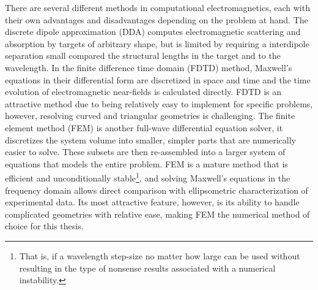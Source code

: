There are several different methods in computational electromagnetics, each with their own advantages and disadvantages depending on the problem at hand. The discrete dipole approximation (DDA) computes electromagnetic scattering and absorption by targets of arbitrary shape, but is limited by requiring a interdipole separation small compared the structural lengths in the target and to the wavelength\cite{DDA}. In the finite difference time domain (FDTD) method, Maxwell's equations in their differential form are discretized in space and time and the time evolution of electromagnetic near-fields is calculated directly\cite{FDTD}. FDTD is an attractive method due to being relatively easy to implement for specific problems, however, resolving curved and triangular geometries is challenging. The finite element method (FEM) is another full-wave differential equation solver, it discretizes the system volume into smaller, simpler parts that are numerically easier to solve. These subsets are then re-assembled into a larger system of equations that models the entire problem\cite{FEM_in_EM_jianming_jin}. FEM is a mature method that is efficient and unconditionally stable\footnote{That is, if a wavelength step-size no matter how large can be used without resulting in the type of nonsense results associated with a numerical instability.}\cite{CEM_course}, and solving Maxwell's equations in the frequency domain allows direct comparison with ellipsometric characterization of experimental data. Its most attractive feature, however, is its ability to handle complicated geometries with relative ease, making FEM the numerical method of choice for this thesis. 



